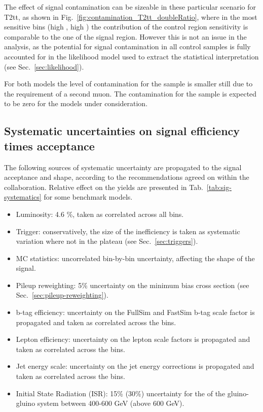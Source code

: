 The effect of signal contamination can be sizeable in these particular scenario for T2tt, 
as shown in Fig.~\ref{fig:contamination_T2tt_doubleRatio}, where in the most sensitive bins 
(high \nb, high \nj) the contribution of the control region sensitivity is comparable to 
the one of the signal region. However this is not an issue in the analysis, as 
the potential for signal contamination in all control samples
is fully accounted for in the likelihood model used to extract
the statistical interpretation (see Sec.~\ref{sec:likelihood}). 

For both models the level of contamination for the
\mmj sample is smaller still due to the requirement of a second
muon. The contamination for the \gj sample is expected to be zero for
the models under consideration. 

\subsection{Systematic uncertainties on signal efficiency times acceptance}
\label{sec:sig-syst}
The following sources of systematic uncertainty are propagated to the signal acceptance and shape, 
according to the recommendations agreed on within the collaboration. 
Relative effect on the yields are presented in Tab.~\ref{tab:sig-systematics} for some benchmark models. 

\begin{itemize}
  \item Luminosity: 4.6 \%, taken as correlated across all bins.
  \item Trigger: conservatively, the size of the inefficiency is taken as systematic variation 
    where not in the plateau (see Sec.~\ref{sec:triggers}). 
  \item MC statistics:  uncorrelated bin-by-bin uncertainty, affecting the shape of the signal. 
  \item Pileup reweighting: 5\% uncertainty on the minimum bias cross section (see Sec.~\ref{sec:pileup-reweighting}).
  \item b-tag efficiency: uncertainty on the FullSim and FastSim b-tag scale factor is propagated and taken as correlated across the bins. 
  \item Lepton efficiency: uncertainty on the lepton scale factors is propagated and taken as correlated across the bins. 
  \item Jet energy scale: uncertainty on the jet energy corrections is propagated and taken as correlated across the bins.
  \item Initial State Radiation (ISR): 15\% (30\%) uncertainty for the \Pt of the gluino-gluino system between 400-600 GeV (above 600 GeV). 
\end{itemize}



